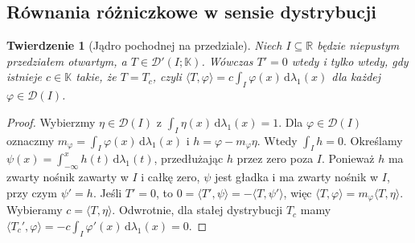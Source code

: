 \documentclass[11pt,a4paper]{article}
\numberwithin{equation}{section}
\theoremstyle{plain}
\newtheorem{twierdzenie}{Twierdzenie}[section]
\theoremstyle{definition}
\theoremstyle{remark}
\newcommand{\R}{\mathbb R}
\newcommand{\K}{\mathbb K}
\begin{document}
\subsection{Równania różniczkowe w sensie dystrybucji}

\begin{twierdzenie}[Jądro pochodnej na przedziale]
\label{thm:zero-derivative20}
Niech $I\subseteq\R$ będzie niepustym przedziałem otwartym,
a $T\in\mathcal D'(I;\K)$. Wówczas $T'=0$
wtedy i tylko wtedy, gdy istnieje $c\in\K$ takie, że
$T=T_c$, czyli
$\langle T,\varphi\rangle=c\int_I\varphi(x)\,\mathrm d\lambda_1(x)$
dla każdej $\varphi\in\mathcal D(I)$.
\end{twierdzenie}
\begin{proof}
Wybierzmy $\eta\in\mathcal D(I)$ z
$\int_I\eta(x)\,\mathrm d\lambda_1(x)=1$.
Dla $\varphi\in\mathcal D(I)$ oznaczmy
$m_\varphi=\int_I\varphi(x)\,\mathrm d\lambda_1(x)$
i $h=\varphi-m_\varphi\eta$. Wtedy $\int_Ih=0$.
Określamy $\psi(x)=\int_{-\infty}^xh(t)\,\mathrm d\lambda_1(t)$,
przedłużając $h$ przez zero poza $I$.
Ponieważ $h$ ma zwarty nośnik zawarty w $I$ i całkę zero,
$\psi$ jest gładka i ma zwarty nośnik w $I$, przy czym
$\psi'=h$. Jeśli $T'=0$, to
$0=\langle T',\psi\rangle=-\langle T,\psi'\rangle$,
więc $\langle T,\varphi\rangle=m_\varphi\langle T,\eta\rangle$.
Wybieramy $c=\langle T,\eta\rangle$.
Odwrotnie, dla stałej dystrybucji $T_c$ mamy
$\langle T_c',\varphi\rangle=-c\int_I\varphi'(x)\,
\mathrm d\lambda_1(x)=0$.
\end{proof}
\end{document}
